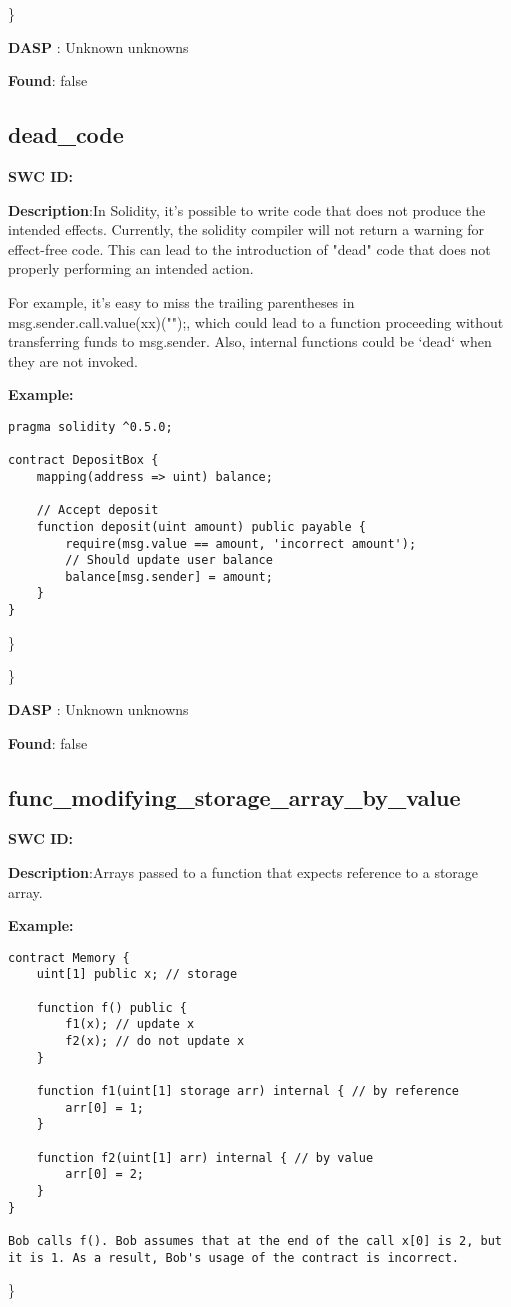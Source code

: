 \documentclass{article}
\begin{document}
\} 

\textbf{DASP} : Unknown unknowns

\textbf{Found}: false

\subsection{dead\_code} 
\textbf{SWC \textunderscore ID:} 

\textbf{Description}:In Solidity, it's possible to write code that does not produce the intended effects. Currently, the solidity compiler will not return a warning for effect-free code. This can lead to the introduction of "dead" code that does not properly performing an intended action.

For example, it's easy to miss the trailing parentheses in msg.sender.call.value(xx)("");, which could lead to a function proceeding without transferring funds to msg.sender. Also, internal functions could be `dead` when they are not invoked.


\textbf{Example:} 
\begin{verbatim}
pragma solidity ^0.5.0;

contract DepositBox {
    mapping(address => uint) balance;

    // Accept deposit
    function deposit(uint amount) public payable {
        require(msg.value == amount, 'incorrect amount');
        // Should update user balance
        balance[msg.sender] = amount;
    }
}

\end{verbatim}\} 

\} 

\textbf{DASP} : Unknown unknowns

\textbf{Found}: false

\subsection{func\_modifying\_storage\_array\_by\_value} 
\textbf{SWC \textunderscore ID:} 

\textbf{Description}:Arrays passed to a function that expects reference to a storage array.


\textbf{Example:} 
\begin{verbatim}
contract Memory {
    uint[1] public x; // storage

    function f() public {
        f1(x); // update x
        f2(x); // do not update x
    }

    function f1(uint[1] storage arr) internal { // by reference
        arr[0] = 1;
    }

    function f2(uint[1] arr) internal { // by value
        arr[0] = 2;
    }
}

Bob calls f(). Bob assumes that at the end of the call x[0] is 2, but it is 1. As a result, Bob's usage of the contract is incorrect.

\end{verbatim}\} 
\end{document}
